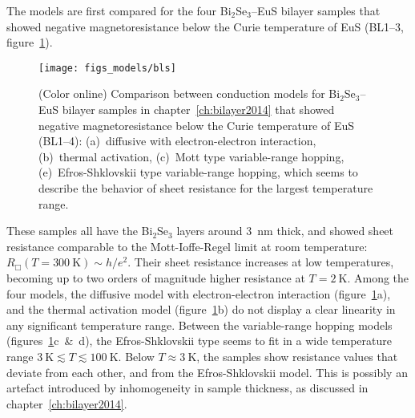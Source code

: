 The models are first compared for the four Bi$_2$Se$_3$--EuS bilayer samples that showed negative magnetoresistance below the Curie temperature of EuS (BL1--3, figure~\ref{fig:models_bls}).%
\begin{figure}[ht]%
    \centering%
    \texttt{[image: figs\_models/bls]}%
    \caption[Conduction model comparison: Bi$_2$Se$_3$--EuS bilayers: BL1--BL4]{\label{fig:models_bls}(Color online) Comparison between conduction models for Bi$_2$Se$_3$--EuS bilayer samples in chapter~\ref{ch:bilayer2014} that showed negative magnetoresistance below the Curie temperature of EuS (BL1--4): (a)~diffusive with electron-electron interaction, (b)~thermal activation, (c)~Mott type variable-range hopping, (e)~Efros-Shklovskii type variable-range hopping, which seems to describe the behavior of sheet resistance for the largest temperature range.}%
\end{figure} %
%
These samples all have the Bi$_2$Se$_3$ layers around \SI{3}{nm} thick, and showed sheet resistance comparable to the Mott-Ioffe-Regel limit at room temperature: $R_\Box(T=300~\mathrm{K}) \sim h/e^2$. Their sheet resistance increases at low temperatures, becoming up to two orders of magnitude higher resistance at $T = 2~\mathrm{K}$. Among the four models, the diffusive model with electron-electron interaction (figure~\ref{fig:models_bls}a), and the thermal activation model (figure~\ref{fig:models_bls}b) do not display a clear linearity in any significant temperature range. Between the variable-range hopping models (figures~\ref{fig:models_bls}c~\&~d), the Efros-Shklovskii type seems to fit in a wide temperature range $3~\mathrm{K} \lesssim T \lesssim 100~\mathrm{K}$. Below $T \approx 3~\mathrm{K}$, the samples show resistance values that deviate from each other, and from the Efros-Shklovskii model. This is possibly an artefact introduced by inhomogeneity in sample thickness, as discussed in chapter~\ref{ch:bilayer2014}.


